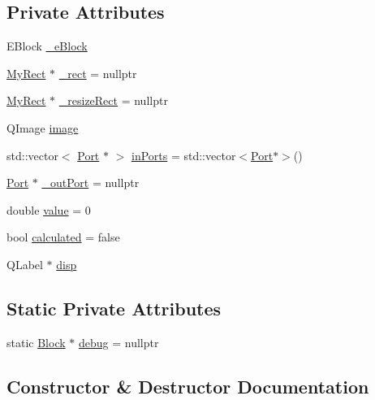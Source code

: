 \subsection*{Private Attributes}
\begin{DoxyCompactItemize}
\item 
E\+Block \hyperlink{classBlock_a2078fc6dc0ee457f3332a38685fea0af}{\+\_\+e\+Block}
\item 
\hyperlink{classMyRect}{My\+Rect} $\ast$ \hyperlink{classBlock_a310ce3c87df1c29e3bfa15aafb9b21c0}{\+\_\+rect} = nullptr
\item 
\hyperlink{classMyRect}{My\+Rect} $\ast$ \hyperlink{classBlock_ae7f260f0bdfd696d33b758a68de30d4c}{\+\_\+resize\+Rect} = nullptr
\item 
Q\+Image \hyperlink{classBlock_aab61fd446868e41197a55c79dc7d709b}{image}
\item 
std\+::vector$<$ \hyperlink{classPort}{Port} $\ast$ $>$ \hyperlink{classBlock_a2b9ee38ee6794399262907587010ed3d}{in\+Ports} = std\+::vector$<$\hyperlink{classPort}{Port}$\ast$$>$()
\item 
\hyperlink{classPort}{Port} $\ast$ \hyperlink{classBlock_a07a89d0108abe2b1ab8b69aabe815d73}{\+\_\+out\+Port} = nullptr
\item 
double \hyperlink{classBlock_afb64e6479c44387ece15c0f8d635236f}{value} = 0
\item 
bool \hyperlink{classBlock_a78ba2fc9a1343e5d9f6f372888e90bf2}{calculated} = false
\item 
Q\+Label $\ast$ \hyperlink{classBlock_a1d3b391e9531eb8bc0b0362730d4c53d}{disp}
\end{DoxyCompactItemize}
\subsection*{Static Private Attributes}
\begin{DoxyCompactItemize}
\item 
static \hyperlink{classBlock}{Block} $\ast$ \hyperlink{classBlock_aad15dd9091823b114a17df309bd68bf4}{debug} = nullptr
\end{DoxyCompactItemize}


\subsection{Constructor \& Destructor Documentation}
\mbox{\label{classBlock_a323497a43c8db217fce86704990008c9}} 
